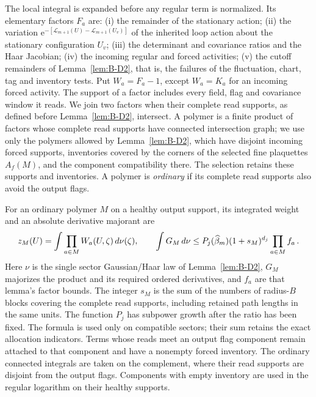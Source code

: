The local integral is expanded before any regular term is normalized. Its elementary factors $F_a$ are: (i) the remainder of the stationary action; (ii) the variation $\mathrm e^{-[\mathcal L_{m+1}(U)-\mathcal L_{m+1}(U_v)]}$ of the inherited loop action about the stationary configuration $U_v$; (iii) the determinant and covariance ratios and the Haar Jacobian; (iv) the incoming regular and forced activities; (v) the cutoff remainders of Lemma~\ref{lem:B-D2}, that is, the failures of the fluctuation, chart, tag and inventory tests. Put $W_a=F_a-1$, except $W_a=K_a$ for an incoming forced activity. The support of a factor includes every field, flag and covariance window it reads. We join two factors when their complete read supports, as defined before Lemma~\ref{lem:B-D2}, intersect. A polymer is a finite product of factors whose complete read supports have connected intersection graph; we use only the polymers allowed by Lemma~\ref{lem:B-D2}, which have disjoint incoming forced supports, inventories covered by the corners of the selected fine plaquettes $A_f(M)$, and the component compatibility there. The selection retains these supports and inventories. A polymer is \emph{ordinary} if its complete read supports also avoid the output flags.

For an ordinary polymer $M$ on a healthy output support, its integrated weight and an absolute derivative majorant are
\begin{equation}\label{eq:D-seed-required}
z_M(U)=\int\prod_{a\in M}W_a(U,\zeta)\,d\nu(\zeta),
\qquad
\int G_M\,d\nu\le P_j(\widehat{\beta}_m)(1+s_M)^{d_j}
\prod_{a\in M}f_a\,.
\end{equation}
Here $\nu$ is the single sector Gaussian/Haar law of Lemma~\ref{lem:B-D2}, $G_M$ majorizes the product and its required ordered derivatives, and $f_a$ are that lemma's factor bounds. The integer $s_M$ is the sum of the numbers of radius-$B$ blocks covering the complete read supports, including retained path lengths in the same units. The function $P_j$ has subpower growth after the ratio has been fixed. The formula is used only on compatible sectors; their sum retains the exact allocation indicators. Terms whose reads meet an output flag component remain attached to that component and have a nonempty forced inventory. The ordinary connected integrals are taken on the complement, where their read supports are disjoint from the output flags. Components with empty inventory are used in the regular logarithm on their healthy supports.

